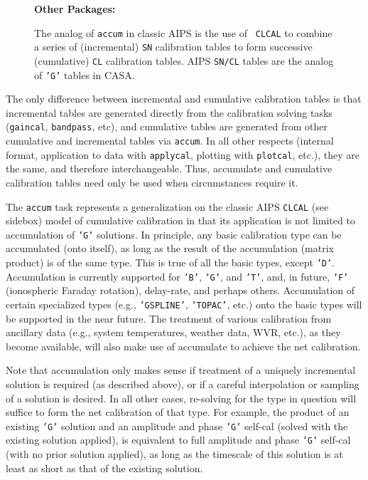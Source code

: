 \begin{wrapfigure}{r}{2.5in}
  \begin{boxedminipage}{2.5in}
     \centerline{\bf Other Packages:}
     The analog of {\tt accum} in classic AIPS is the use of {\tt
     CLCAL} to combine a series of (incremental) {\tt SN} calibration
     tables to form successive (cumulative) {\tt CL} calibration
     tables. AIPS {\tt SN/CL} tables are the analog of {\tt 'G'} 
     tables in CASA.
  \end{boxedminipage}
\end{wrapfigure}

The only difference between incremental and cumulative calibration
tables is that incremental tables are generated directly from the
calibration solving tasks ({\tt gaincal}, {\tt bandpass}, etc), and
cumulative tables are generated from other cumulative and incremental
tables via {\tt accum}. In all other respects (internal format,
application to data with {\tt applycal}, plotting with {\tt plotcal},
etc.), they are the same, and therefore interchangeable. Thus,
accumulate and cumulative calibration tables need only be used when
circumstances require it.

The {\tt accum} task represents a generalization on the classic AIPS
{\tt CLCAL} (see sidebox) model of cumulative calibration in that its
application is not limited to accumulation of {\tt 'G'} solutions. 
In principle, any
basic calibration type can be accumulated (onto itself), as long as the
result of the accumulation (matrix product) is of the same type. This is
true of all the basic types, except {\tt 'D'}. Accumulation is currently
supported for {\tt 'B'}, {\tt 'G'}, and {\tt 'T'}, and, in future,
{\tt 'F'} (ionospheric Faraday rotation), delay-rate, and perhaps
others. Accumulation of certain specialized
types (e.g., {\tt 'GSPLINE'}, {\tt 'TOPAC'}, etc.) onto the basic types will be
supported in the near future. The treatment of various calibration from
ancillary data (e.g., system temperatures, weather data, WVR, etc.), as
they become available, will also make use of accumulate to achieve the net
calibration.

Note that accumulation only makes sense if treatment of a uniquely
incremental solution is required (as described above), or if a careful
interpolation or sampling of a solution is desired. In all other cases,
re-solving for the type in question will suffice to form the net
calibration of that type. For example, the product of an existing {\tt 'G'}
solution and an amplitude and phase {\tt 'G'} self-cal (solved with the
existing solution applied), is equivalent to full amplitude and phase
{\tt 'G'} self-cal (with no prior solution applied), as long as the timescale
of this solution is at least as short as that of the existing solution.

